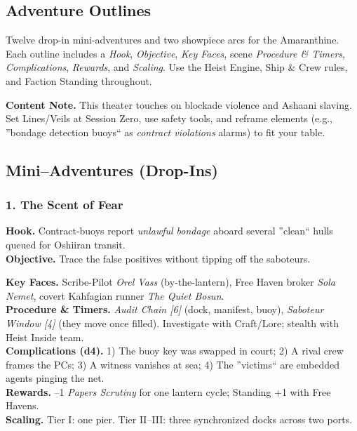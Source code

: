 \documentclass[11pt,oneside]{book}
\begin{document}
\begin{itemize}
\chapter{Adventure Outlines}

\noindent Twelve drop-in mini-adventures and two showpiece arcs for the Amaranthine. Each outline includes a \emph{Hook}, \emph{Objective}, \emph{Key Faces}, scene \emph{Procedure \& Timers}, \emph{Complications}, \emph{Rewards}, and \emph{Scaling}. Use the Heist Engine, Ship \& Crew rules, and Faction Standing throughout.

\begin{tcolorbox}[breakable]
\textbf{Content Note.} This theater touches on blockade violence and Ashaani slaving. Set Lines/Veils at Session Zero, use safety tools, and reframe elements (e.g., ''bondage detection buoys`` as \emph{contract violations} alarms) to fit your table.
\end{tcolorbox}

\section{Mini--Adventures (Drop-Ins)}

\subsection*{1. The Scent of Fear}
\textbf{Hook.} Contract-buoys report \emph{unlawful bondage} aboard several ''clean`` hulls queued for Oshiiran transit.\\
\textbf{Objective.} Trace the false positives without tipping off the saboteurs.

\textbf{Key Faces.} Scribe-Pilot \emph{Orel Vass} (by-the-lantern), Free Haven broker \emph{Sola Nemet}, covert Kahfagian runner \emph{The Quiet Bosun}.\\
\textbf{Procedure \& Timers.} \emph{Audit Chain [6]} (dock, manifest, buoy), \emph{Saboteur Window [4]} (they move once filled). Investigate with Craft/Lore; stealth with Heist Inside team.\\
\textbf{Complications (d4).} 1) The buoy key was swapped in court; 2) A rival crew frames the PCs; 3) A witness vanishes at sea; 4) The ''victims`` are embedded agents pinging the net.\\
\textbf{Rewards.} --1 \emph{Papers Scrutiny} for one lantern cycle; Standing +1 with Free Havens.\\
\textbf{Scaling.} Tier I: one pier. Tier II--III: three synchronized docks across two ports.


\end{itemize}
\end{document}

